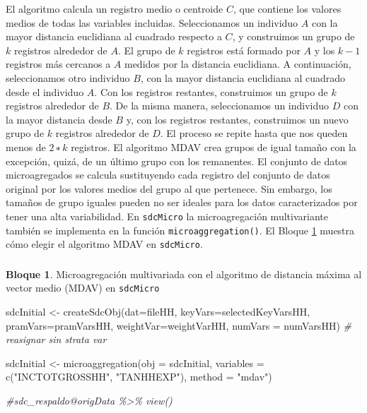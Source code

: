 \documentclass[
]{book}
\newenvironment{Shaded}{\begin{snugshade}}{\end{snugshade}}
\newcommand{\AttributeTok}[1]{\textcolor[rgb]{0.77,0.63,0.00}{#1}}
\newcommand{\CommentTok}[1]{\textcolor[rgb]{0.56,0.35,0.01}{\textit{#1}}}
\newcommand{\FunctionTok}[1]{\textcolor[rgb]{0.00,0.00,0.00}{#1}}
\newcommand{\NormalTok}[1]{#1}
\newcommand{\OtherTok}[1]{\textcolor[rgb]{0.56,0.35,0.01}{#1}}
\newcommand{\StringTok}[1]{\textcolor[rgb]{0.31,0.60,0.02}{#1}}
\theoremstyle{definition}
\theoremstyle{definition}
\newtheorem{example}{Bloque}[chapter]
\theoremstyle{definition}
\theoremstyle{definition}
\theoremstyle{remark}
\begin{document}
El algoritmo calcula un registro medio o centroide \(C\), que contiene los valores medios de todas las variables incluidas. Seleccionamos un individuo \(A\) con la mayor distancia euclidiana al cuadrado respecto a \(C\), y construimos un grupo de \(k\) registros alrededor de \(A\). El grupo de \(k\) registros está formado por \(A\) y los \(k-1\) registros más cercanos a \(A\) medidos por la distancia euclidiana. A continuación, seleccionamos otro individuo \(B\), con la mayor distancia euclidiana al cuadrado desde el individuo \(A\). Con los registros restantes, construimos un grupo de \(k\) registros alrededor de \(B\). De la misma manera, seleccionamos un individuo \(D\) con la mayor distancia desde \(B\) y, con los registros restantes, construimos un nuevo grupo de \(k\) registros alrededor de \(D\). El proceso se repite hasta que nos queden menos de \(2∗k\) registros. El algoritmo MDAV crea grupos de igual tamaño con la excepción, quizá, de un último grupo con los remanentes. El conjunto de datos microagregados se calcula sustituyendo cada registro del conjunto de datos original por los valores medios del grupo al que pertenece. Sin embargo, los tamaños de grupo iguales pueden no ser ideales para los datos caracterizados por tener una alta variabilidad. En \texttt{sdcMicro} la microagregación multivariante también se implementa en la función \texttt{microaggregation()}. El Bloque \ref{exm:bloque31jgm} muestra cómo elegir el algoritmo MDAV en \texttt{sdcMicro}.

\hypertarget{section-5}{%
\subsubsection{}\label{section-5}}

\begin{example}
\protect\hypertarget{exm:bloque31jgm}{}\label{exm:bloque31jgm}Microagregación multivariada con el algoritmo de distancia máxima al vector medio (MDAV) en \texttt{sdcMicro}
\end{example}

\begin{Shaded}
\begin{Highlighting}[]
\NormalTok{sdcInitial }\OtherTok{\textless{}{-}} \FunctionTok{createSdcObj}\NormalTok{(}\AttributeTok{dat=}\NormalTok{fileHH, }\AttributeTok{keyVars=}\NormalTok{selectedKeyVarsHH, }\AttributeTok{pramVars=}\NormalTok{pramVarsHH, }\AttributeTok{weightVar=}\NormalTok{weightVarHH, }\AttributeTok{numVars =}\NormalTok{ numVarsHH) }\CommentTok{\# reasignar sin strata var}

\NormalTok{sdcInitial }\OtherTok{\textless{}{-}} \FunctionTok{microaggregation}\NormalTok{(}\AttributeTok{obj =}\NormalTok{ sdcInitial, }\AttributeTok{variables =} \FunctionTok{c}\NormalTok{(}\StringTok{"INCTOTGROSSHH"}\NormalTok{, }\StringTok{"TANHHEXP"}\NormalTok{), }\AttributeTok{method =} \StringTok{"mdav"}\NormalTok{)}

\CommentTok{\#sdc\_respaldo@origData \%\textgreater{}\% view()}
\end{Highlighting}
\end{Shaded}
\end{document}
